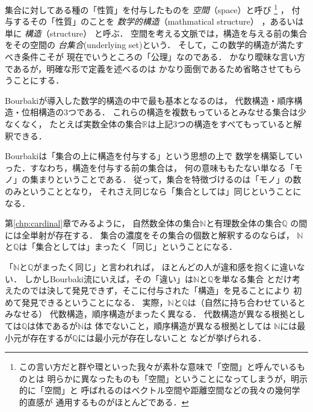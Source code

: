   集合に対してある種の「性質」を付与したものを
  \emph{空間}（space）と呼び
  \footnote{この言い方だと群や環といった我々が素朴な意味で「空間」と呼んでいるものとは
    明らかに異なったものも「空間」ということになってしまうが，明示的に「空間」と
    呼ばれるのはベクトル空間や距離空間などの我々の幾何学的直感が
    通用するものがほとんどである．}
  ，
  付与するその「性質」のことを
  \emph{数学的構造}（mathmatical structure）
  ，あるいは単に %
  \emph{構造}（structure）
  と呼ぶ．
  空間を考える文脈では，構造を与える前の集合をその空間の
  \emph{台集合}(underlying set)という．
  そして，この数学的構造が満たすべき条件こそが
  現在でいうところの「公理」なのである．
  かなり曖昧な言い方であるが，明確な形で定義を述べるのは
  かなり面倒であるため省略させてもらうことにする．

  Bourbakiが導入した数学的構造の中で最も基本となるのは，
  代数構造・順序構造・位相構造の3つである．
  これらの構造を複数もっているとみなせる集合は少なくなく，
  たとえば実数全体の集合$\mathbb{R}$は上記3つの構造をすべてもっていると解釈できる．
  
  Bourbakiは「集合の上に構造を付与する」という思想の上で
  数学を構築していった．すなわち，構造を付与する前の集合は，
  何の意味ももたない単なる「モノ」の集まりということである．
  従って，集合を特徴づけるのは「モノ」の数のみということとなり，
  それさえ同じなら「集合としては」同じということになる．

  \begin{ex} \label{ex:setisomorphic}
    第\ref{chp:cardinal}章でみるように，
    自然数全体の集合$\mathbb{N}$と有理数全体の集合$\mathbb{Q}$
    の間には全単射が存在する．
    集合の濃度をその集合の個数と解釈するのならば，
    $\mathbb{N}$と$\mathbb{Q}$は「集合としては」まったく「同じ」ということになる．
  \end{ex}

  「$\mathbb{N}$と$\mathbb{Q}$がまったく同じ」と言われれば，
  ほとんどの人が違和感を抱くに違いない．
  しかしBourbaki流にいえば，その「違い」は$\mathbb{N}$と$\mathbb{Q}$を単なる集合
  とだけ考えたのでは決して発見できず，そこに付与された「構造」を見ることにより
  初めて発見できるということになる．
  実際，$\mathbb{N}$と$\mathbb{Q}$は（自然に持ち合わせているとみなせる）
  代数構造，順序構造がまったく異なる．
  代数構造が異なる根拠としては$\mathbb{Q}$は体であるが$\mathbb{N}$は
  体でないこと，順序構造が異なる根拠としては
  $\mathbb{N}$には最小元が存在するが$\mathbb{Q}$には最小元が存在しないこと
  などが挙げられる．

